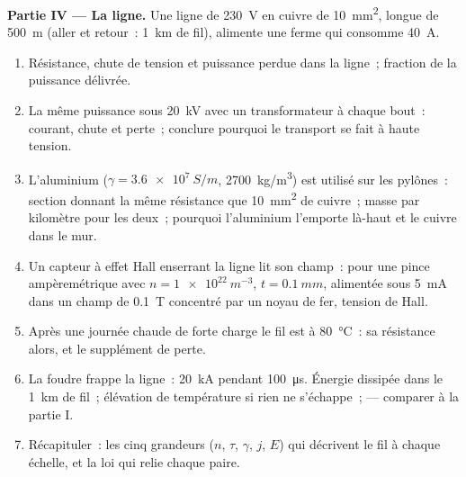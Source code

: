 \begin{problem}
\medskip
\noindent\textbf{Partie IV --- La ligne.}
Une ligne de \qty{230}{V} en cuivre de \qty{10}{mm^2}, longue de \qty{500}{m} (aller et retour~:
\qty{1}{km} de fil), alimente une ferme qui consomme \qty{40}{A}.
\begin{enumerate}[resume]
  \item Résistance, chute de tension et puissance perdue dans la ligne~; fraction
        de la puissance délivrée.
  \item La même puissance sous \qty{20}{kV} avec un transformateur à chaque bout~:
        courant, chute et perte~; conclure pourquoi le transport se fait à
        haute tension.
  \item L'aluminium ($\gamma = \qty{3.6e7}{S/m}$, \qty{2700}{kg/m^3}) est utilisé sur les
        pylônes~: section donnant la même résistance que \qty{10}{mm^2} de
        cuivre~; masse par kilomètre pour les deux~; pourquoi l'aluminium l'emporte là-haut
        et le cuivre dans le mur.
  \item Un capteur à effet Hall enserrant la ligne lit son champ~: pour
        une pince ampèremétrique avec $n = \qty{1e22}{m^{-3}}$, $t = \qty{0.1}{mm}$, alimentée sous
        \qty{5}{mA} dans un champ de \qty{0.1}{T} concentré par un noyau de fer,
        tension de Hall.
  \item Après une journée chaude de forte charge le fil est à \qty{80}{\degreeCelsius}~:
        sa résistance alors, et le supplément de perte.
  \item La foudre frappe la ligne~: \qty{20}{kA} pendant \qty{100}{\micro s}. Énergie
        dissipée dans le \qty{1}{km} de fil~; élévation de température si rien
        ne s'échappe~;  --- comparer à la partie I.
  \item Récapituler~: les cinq grandeurs ($n$, $\tau$, $\gamma$, $j$, $E$) qui
        décrivent le fil à chaque échelle, et la loi qui relie chaque
        paire.
\end{enumerate}
\end{problem}
